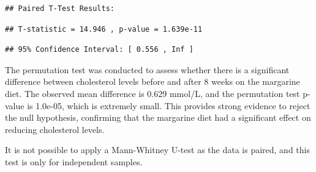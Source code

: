 \documentclass[
  11pt,
]{article}
\newenvironment{Shaded}{\begin{snugshade}}{\end{snugshade}}
\newcommand{\AttributeTok}[1]{\textcolor[rgb]{0.13,0.29,0.53}{#1}}
\newcommand{\ConstantTok}[1]{\textcolor[rgb]{0.56,0.35,0.01}{#1}}
\newcommand{\ControlFlowTok}[1]{\textcolor[rgb]{0.13,0.29,0.53}{\textbf{#1}}}
\newcommand{\DecValTok}[1]{\textcolor[rgb]{0.00,0.00,0.81}{#1}}
\newcommand{\FunctionTok}[1]{\textcolor[rgb]{0.13,0.29,0.53}{\textbf{#1}}}
\newcommand{\NormalTok}[1]{#1}
\newcommand{\OtherTok}[1]{\textcolor[rgb]{0.56,0.35,0.01}{#1}}
\newcommand{\SpecialCharTok}[1]{\textcolor[rgb]{0.81,0.36,0.00}{\textbf{#1}}}
\newcommand{\StringTok}[1]{\textcolor[rgb]{0.31,0.60,0.02}{#1}}
\begin{document}
\begin{verbatim}
## Paired T-Test Results:
\end{verbatim}

\begin{verbatim}
## T-statistic = 14.946 , p-value = 1.639e-11
\end{verbatim}

\begin{verbatim}
## 95% Confidence Interval: [ 0.556 , Inf ]
\end{verbatim}

The permutation test was conducted to assess whether there is a
significant difference between cholesterol levels before and after 8
weeks on the margarine diet. The observed mean difference is 0.629
mmol/L, and the permutation test p-value is 1.0e-05, which is extremely
small. This provides strong evidence to reject the null hypothesis,
confirming that the margarine diet had a significant effect on reducing
cholesterol levels.

It is not possible to apply a Mann-Whitney U-test as the data is paired,
and this test is only for independent samples.

\begin{Shaded}
\end{Shaded}
\end{document}

